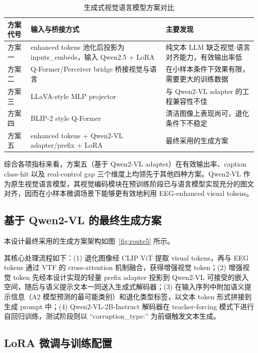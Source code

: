 \begin{table}[htbp]
  \centering
  \caption{生成式视觉语言模型方案对比}
  \label{tab:route-comparison}
  \begin{tabularx}{\linewidth}{l l X}
    \toprule
    方案代号 & 输入与桥接方式 & 主要发现 \\
    \midrule
    方案一 & enhanced tokens 池化后投影为 inputs\_embeds，输入 Qwen2.5 + LoRA & 纯文本 LLM 缺乏视觉-语言对齐能力，有效输出率低 \\
    方案二 & Q-Former/Perceiver bridge 桥接视觉与语言 & 在小样本条件下效果有限，需要更大的训练数据 \\
    方案三 & LLaVA-style MLP projector & 与 Qwen2-VL adapter 的工程兼容性不佳 \\
    方案四 & BLIP-2 style Q-Former & 清洁图像上表现尚可，退化条件下不稳定 \\
    方案五 & enhanced tokens + Qwen2-VL adapter/prefix + LoRA & 最终采用的生成方案 \\
    \bottomrule
  \end{tabularx}
\end{table}

综合各项指标来看，方案五（基于 Qwen2-VL adapter）在有效输出率、caption class-hit 以及 real-control gap 三个维度上均领先于其他四种方案。Qwen2-VL 作为原生视觉语言模型，其视觉编码模块在预训练阶段已与语言模型实现充分的图文对齐，因而在小样本微调场景下能够更有效地利用 EEG-enhanced visual tokens。

\subsection{基于 Qwen2-VL 的最终生成方案}

本设计最终采用的生成方案架构如图~\ref{fig:route5} 所示。


其核心处理流程如下：(1) 退化图像经 CLIP ViT 提取 visual tokens，再与 EEG tokens 通过 VTF 的 cross-attention 机制融合，获得增强视觉 token；(2) 增强视觉 token 先经本设计实现的轻量 prefix adapter 投影到 Qwen2-VL 可接受的嵌入空间，随后与语义提示文本一同送入生成式解码器；(3) 在输入序列中附加语义提示信息（A2 模型预测的最可能类别）和退化类型标签，以文本 token 形式拼接到生成 prompt 中；(4) Qwen2-VL-2B-Instruct 解码器在 teacher-forcing 模式下进行自回归训练，测试阶段则以 ``corruption\_type:'' 为前缀触发文本生成。

\subsection{LoRA 微调与训练配置}

